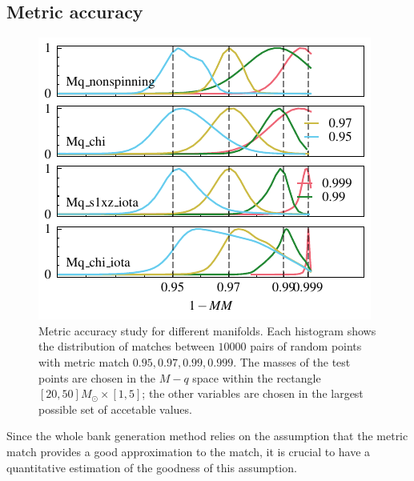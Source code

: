 \documentclass[twocolumn,showpacs,preprintnumbers,nofootinbib,prd,
superscriptaddress,10pt]{revtex4-1}
\begin{document}
\subsection{Metric accuracy} \label{sec:metric_accuracy}

\begin{figure}[t]
	\includegraphics{metric_accuracy}
	\caption{Metric accuracy study for different manifolds. Each histogram shows the distribution of matches between $10000$ pairs of random points with metric match $0.95, 0.97, 0.99, 0.999$. The masses of the test points are chosen in the $M-q$ space within the rectangle ${[20, 50] M_\odot \times [1,5]}$; the other variables are chosen in the largest possible set of accetable values. }
	\label{fig:metric_accuracy}
\end{figure}

Since the whole bank generation method relies on the assumption that the metric match provides a good approximation to the match, it is crucial to have a quantitative estimation of the goodness of this assumption.
\end{document}
